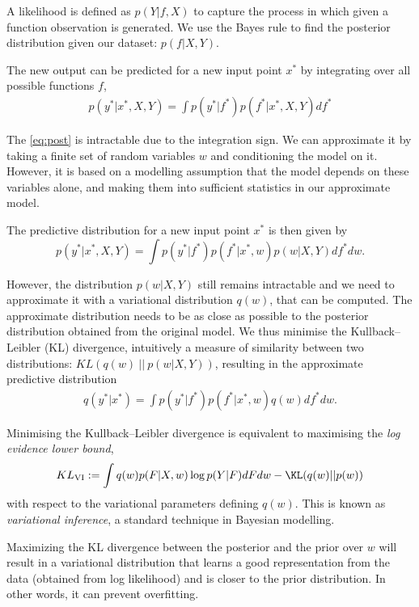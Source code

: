 A likelihood is defined as $p(Y | f, X)$ to capture the process in which given a function observation is generated. We use the Bayes rule to find the posterior distribution given our dataset: $p(f | X, Y)$.

The new output can be predicted for a new input point $x^*$ by integrating over all possible functions $f$,
\begin{align} \label{eq:post}
p(y^* | x^*, X, Y) = \int p(y^* | f^*) p(f^* | x^*, X, Y) df^*
\end{align}

The \eqref{eq:post} is intractable due to the integration sign. We can approximate it by taking a finite set of random variables $w$ and conditioning the model on it. However, it is based on a modelling assumption that the model depends on these variables alone, and making them into sufficient statistics in our approximate model.

The predictive distribution for a new input point $x^*$ is then given by 
$$
p(y^* | x^*, X, Y) = \int p(y^* | f^*) p(f^* | x^*, w) p(w | X, Y) df^* d w.
$$

However, the distribution $p(w | X, Y)$ still remains intractable and we need to approximate it with a variational distribution $q(w)$, that can be computed. The approximate distribution needs to be as close as possible to the posterior distribution obtained from the original model. We thus minimise the Kullback--Leibler (KL) divergence, intuitively a measure of similarity between two distributions: $KL(q(w) ~||~ p(w | X, Y))$,
resulting in the approximate predictive distribution 
\begin{align} \label{eq:predictive}
q(y^* | x^*) = \int p(y^* | f^*) p(f^* | x^*, w) q(w)  df^* dw.
\end{align}

Minimising the Kullback--Leibler divergence is equivalent to maximising the \textit{log evidence lower bound},
\begin{align}
KL_{\text{VI}} := \int q(w) p(F | X, w) \log p(Y | F) dF dw - \KL(q(w) || p(w)) \label{eq:L:VI}
\end{align}
with respect to the variational parameters defining $q(w)$. This is known as \textit{variational inference}, a standard technique in Bayesian modelling.

Maximizing the KL divergence between the posterior and the prior over $w$ will result in a variational distribution that learns a good representation from the data (obtained from log likelihood) and is closer to the prior distribution. In other words, it can prevent overfitting. 


